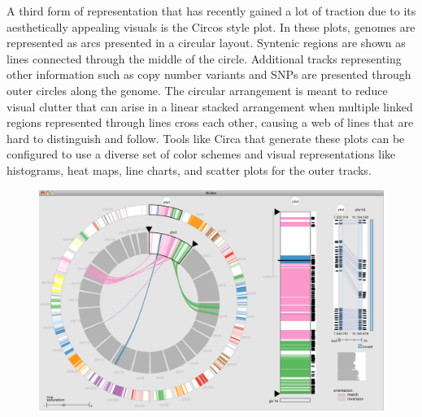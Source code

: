 A third form of representation that has recently gained a lot of traction due to its aesthetically appealing visuals is the Circos style plot\cite{krzywinski2009circos}. In these plots, genomes are represented as arcs presented in a circular layout. Syntenic regions are shown as lines connected through the middle of the circle. Additional tracks representing other information such as copy number variants and SNPs are presented through outer circles along the genome. The circular arrangement is meant to reduce visual clutter that can arise in a linear stacked arrangement when multiple linked regions represented through lines cross each other, causing a web of lines that are hard to distinguish and follow. Tools like Circa that generate these plots can be configured to use a diverse set of color schemes and visual representations like histograms, heat maps, line charts, and scatter plots for the outer tracks\cite{circa}. 

\begin{figure}
  \centering
  \includegraphics[width=0.75\linewidth]{images/ch_2_mizbee.PNG}
  \label{fig:ch_2_mizbee}
\end{figure}

